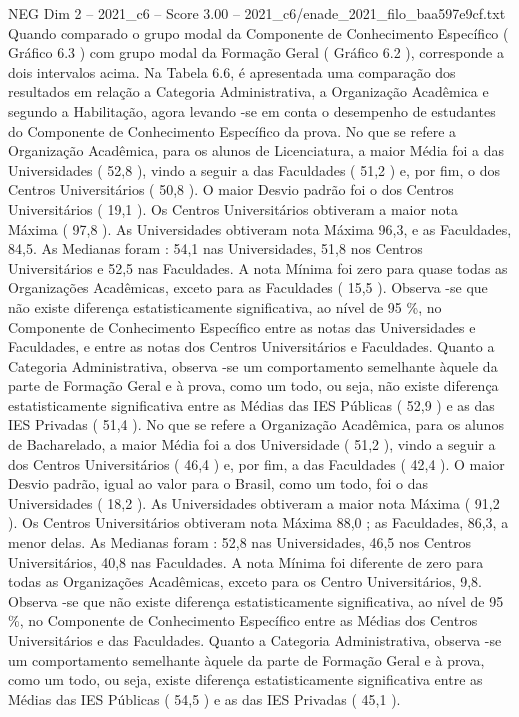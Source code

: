 \begin{textsample}{NEG Dim 2 – 2021\_c6 – Score 3.00 – 2021\_c6/enade\_2021\_filo\_baa597e9cf.txt}
Quando comparado o grupo modal da Componente de Conhecimento Específico ( Gráfico 6.3 ) com grupo modal da Formação Geral ( Gráfico 6.2 ), corresponde a dois intervalos acima.
Na Tabela 6.6, é apresentada uma comparação dos resultados em relação a Categoria Administrativa, a Organização Acadêmica e segundo a Habilitação, agora levando -se em conta o desempenho de estudantes do Componente de Conhecimento Específico da prova.
No que se refere a Organização Acadêmica, para os alunos de Licenciatura, a maior Média foi a das Universidades ( 52,8 ), vindo a seguir a das Faculdades ( 51,2 ) e, por fim, o dos Centros Universitários ( 50,8 ).
O maior Desvio padrão foi o dos Centros Universitários ( 19,1 ).
Os Centros Universitários obtiveram a maior nota Máxima ( 97,8 ).
As Universidades obtiveram nota Máxima 96,3, e as Faculdades, 84,5.
As Medianas foram : 54,1 nas Universidades, 51,8 nos Centros Universitários e 52,5 nas Faculdades.
A nota Mínima foi zero para quase todas as Organizações Acadêmicas, exceto para as Faculdades ( 15,5 ).
Observa -se que não existe diferença estatisticamente significativa, ao nível de 95 \%, no Componente de Conhecimento Específico entre as notas das Universidades e Faculdades, e entre as notas dos Centros Universitários e Faculdades.
Quanto a Categoria Administrativa, observa -se um comportamento semelhante àquele da parte de Formação Geral e à prova, como um todo, ou seja, não existe diferença estatisticamente significativa entre as Médias das IES Públicas ( 52,9 ) e as das IES Privadas ( 51,4 ).
No que se refere a Organização Acadêmica, para os alunos de Bacharelado, a maior Média foi a dos Universidade ( 51,2 ), vindo a seguir a dos Centros Universitários ( 46,4 ) e, por fim, a das Faculdades ( 42,4 ).
O maior Desvio padrão, igual ao valor para o Brasil, como um todo, foi o das Universidades ( 18,2 ).
As Universidades obtiveram a maior nota Máxima ( 91,2 ).
Os Centros Universitários obtiveram nota Máxima 88,0 ; as Faculdades, 86,3, a menor delas.
As Medianas foram : 52,8 nas Universidades, 46,5 nos Centros Universitários, 40,8 nas Faculdades.
A nota Mínima foi diferente de zero para todas as Organizações Acadêmicas, exceto para os Centro Universitários, 9,8.
Observa -se que não existe diferença estatisticamente significativa, ao nível de 95 \%, no Componente de Conhecimento Específico entre as Médias dos Centros Universitários e das Faculdades.
Quanto a Categoria Administrativa, observa -se um comportamento semelhante àquele da parte de Formação Geral e à prova, como um todo, ou seja, existe diferença estatisticamente significativa entre as Médias das IES Públicas ( 54,5 ) e as das IES Privadas ( 45,1 ).

\end{textsample}
